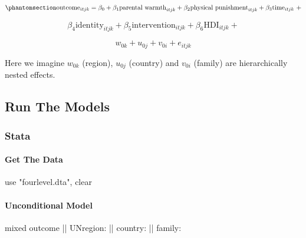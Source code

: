 \documentclass[
  letterpaper,
  DIV=11,
  numbers=noendperiod]{scrreprt}
\let\oldparagraph\paragraph
\renewcommand{\paragraph}[1]{\oldparagraph{#1}\mbox{}}
\newenvironment{Shaded}{\begin{snugshade}}{\end{snugshade}}
\newcommand{\KeywordTok}[1]{\textcolor[rgb]{0.00,0.23,0.31}{#1}}
\newcommand{\NormalTok}[1]{\textcolor[rgb]{0.00,0.23,0.31}{#1}}
\newcommand{\StringTok}[1]{\textcolor[rgb]{0.13,0.47,0.30}{#1}}
\begin{document}
\begin{equation}\phantomsection\label{eq-MLM-fourlevel-multilingual}{\text{outcome}_{itjk} = \beta_0 + \beta_1 \text{parental warmth}_{itjk} + \beta_2 \text{physical punishment}_{itjk} + \beta_3 \text{time}_{itjk} \ + }\end{equation}

\[\beta_4 \text{identity}_{itjk} + \beta_5 \text{intervention}_{itjk} + \beta_6 \text{HDI}_{itjk} +\]

\[w_{0k} + u_{0j} + v_{0i} + e_{itjk}\]

Here we imagine \(w_{0k}\) (region), \(u_{0j}\) (country) and \(v_{0i}\)
(family) are hierarchically nested effects.

\subsection{Run The Models}\label{run-the-models-5}

\subsubsection{Stata}

\paragraph{Get The Data}\label{get-the-data-8}

\begin{Shaded}
\begin{Highlighting}[]

\KeywordTok{use} \StringTok{"fourlevel.dta"}\NormalTok{, }\KeywordTok{clear}
\end{Highlighting}
\end{Shaded}

\paragraph{Unconditional Model}\label{unconditional-model}

\begin{Shaded}
\begin{Highlighting}[]

\NormalTok{mixed outcome || UNregion: || country: || }\KeywordTok{family}\NormalTok{:}
\end{Highlighting}
\end{Shaded}
\end{document}
